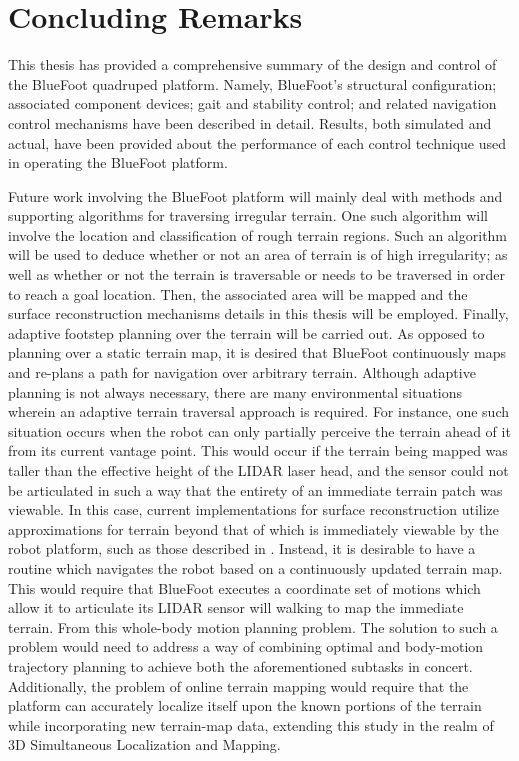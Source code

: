 \chapter{Concluding Remarks}

This thesis has provided a comprehensive summary of the design and control of the BlueFoot quadruped platform. Namely, BlueFoot's structural configuration; associated component devices; gait and stability control; and related navigation control mechanisms have been described in detail. Results, both simulated and actual, have been provided about the performance of each control technique used in operating the BlueFoot platform.

Future work involving the BlueFoot platform will mainly deal with methods and supporting algorithms for traversing irregular terrain.  One such algorithm will involve the location and classification of rough terrain regions. Such an algorithm will be used to deduce whether or not an area of terrain is of high irregularity; as well as whether or not the terrain is traversable or needs to be traversed in order to reach a goal location. Then, the associated area will be mapped and the surface reconstruction mechanisms details in this thesis will be employed. Finally, adaptive footstep planning over the terrain will be carried out. As opposed to planning over a static terrain map, it is desired that BlueFoot continuously maps and re-plans a path for navigation over arbitrary terrain. Although adaptive planning is not always necessary, there are many environmental situations wherein an adaptive terrain traversal approach is required. For instance, one such situation occurs when the robot can only partially perceive the terrain ahead of it from its current vantage point. This would occur if the terrain being mapped was taller than the effective height of the LIDAR laser head, and the sensor could not be articulated in such a way that the entirety of an immediate terrain patch was viewable. In this case, current implementations for surface reconstruction utilize approximations for terrain beyond that of which is immediately viewable by the robot platform, such as those described in \cite{other dudes}. Instead, it is desirable to have a routine which navigates the robot based on a continuously updated terrain map. This would require that BlueFoot executes a coordinate set of motions which allow it to articulate its LIDAR sensor will walking to map the immediate terrain. From this whole-body motion planning problem. The solution to such a problem would need to address a way of combining optimal and body-motion trajectory planning to achieve both the aforementioned subtasks in concert. Additionally, the problem of online terrain mapping would require that the platform can accurately localize itself upon the known portions of the terrain while incorporating new terrain-map data, extending this study in the realm of 3D Simultaneous Localization and Mapping.